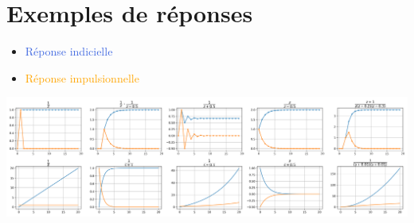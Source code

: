 \documentclass[]{article}
\begin{document}
\begin{multicols}{3}










\end{multicols}
\pagebreak
\section{Exemples de réponses}
\begin{itemize}
\item \textcolor{RoyalBlue}{Réponse indicielle}
\item \textcolor{Orange}{Réponse impulsionnelle}
\end{itemize}
\begin{center}
\includegraphics[width=\textwidth]{Allures.png}
\end{center}
\end{document}
